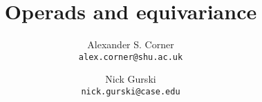 \documentclass{article} %
\title{Operads and equivariance}
\author{
  Alexander S. Corner\\
  \texttt{alex.corner@shu.ac.uk}
  \and
  Nick Gurski\\
  \texttt{nick.gurski@case.edu}
}
\date{}
\theoremstyle{example}
\begin{document}
\maketitle

\tableofcontents

\abstract









% 
%   

\printbibliography
\end{document}
